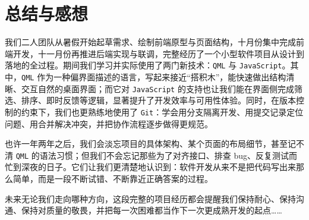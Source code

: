 \documentclass{article}
\begin{document}
	\section{总结与感想}
	我们二人团队从暑假开始起草需求、绘制前端原型与页面结构，十月份集中完成前端开发，十一月份再推进后端实现与联调，完整经历了一个小型软件项目从设计到落地的全过程。期间我们学习并实际使用了两门新技术：\texttt{QML} 与 \texttt{JavaScript}。其中，\texttt{QML} 作为一种偏界面描述的语言，写起来接近“搭积木”，能快速做出结构清晰、交互自然的桌面界面；而它对 \texttt{JavaScript} 的支持也让我们能在界面侧完成筛选、排序、即时反馈等逻辑，显著提升了开发效率与可用性体验。同时，在版本控制的约束下，我们也更熟练地使用了 \texttt{Git}：学会用分支隔离开发、用提交记录定位问题、用合并解决冲突，并把协作流程逐步做得更规范。
	
	也许一年两年之后，我们会淡忘项目的具体架构、某个页面的布局细节，甚至记不清 \texttt{QML} 的语法习惯；但我们不会忘记那些为了对齐接口、排查 bug、反复测试而忙到深夜的日子。它们让我们更清楚地认识到：软件开发从来不是把代码写出来那么简单，而是一段不断试错、不断靠近正确答案的过程。
	
	未来无论我们走向哪种方向，这段完整的项目经历都会提醒我们保持耐心、保持沟通、保持对质量的敬畏，并把每一次困难都当作下一次更成熟开发的起点……
\end{document}
